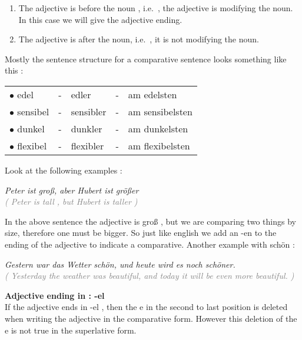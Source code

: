 \documentclass[a4paper,twocolumn,10pt]{article}
\newcommand{\newpar}
{\par \vspace{0.3cm}}
\newcommand{\bulletpoint}
{ $\bullet$  }
\newcommand{\tabularxtable}[3]
{

	\vspace{0.5cm}
	\nolinenumbers

	\begin{tabularx}{#1}{#2}
		#3
	\end{tabularx}

	\linenumbers
	\vspace{0.5cm}
}
\begin{document}



\begin{enumerate}[noitemsep]
	\item The adjective is before the noun , i.e.\ , the adjective is modifying
		the noun. In this case we will give the adjective ending.
	\item The adjective is after the noun, i.e.\ , it is not modifying the noun.
\end{enumerate}


Mostly the sentence structure for a comparative sentence looks something like
this :\\



\tabularxtable
{0.95\linewidth}
{XlXlX}
{
\bulletpoint edel     & - & edler     & - & am edelsten \\
\bulletpoint sensibel & - & sensibler & - & am sensibelsten \\
\bulletpoint dunkel   & - & dunkler   & - & am dunkelsten\\
\bulletpoint flexibel & - & flexibler & - & am flexibelsten\\
}


Look at the following examples :\newpar


\noindent
\textit{Peter ist groß, aber Hubert ist größer}\\
\textcolor{gray} { \textit{( Peter is tall , but Hubert is taller )} } \newpar

In the above sentence the adjective is groß , but we are comparing two things by
size, therefore one must be bigger. So just like english we add an -en to the
ending of the adjective to indicate a comparative. Another example with schön
:\newpar


\noindent
\textit{Gestern war das Wetter schön, und heute wird es noch schöner.}\\
\textcolor{gray} { \textit{( Yesterday the weather was beautiful, and today it
		will be even more beautiful. )} } \newpar


\textbf{Adjective ending in : -el}\\
If the adjective ends in -el , then the e in the
second to last position is deleted when writing the adjective in the comparative
form. However this deletion of the e is not true in the superlative form.
\end{document}
